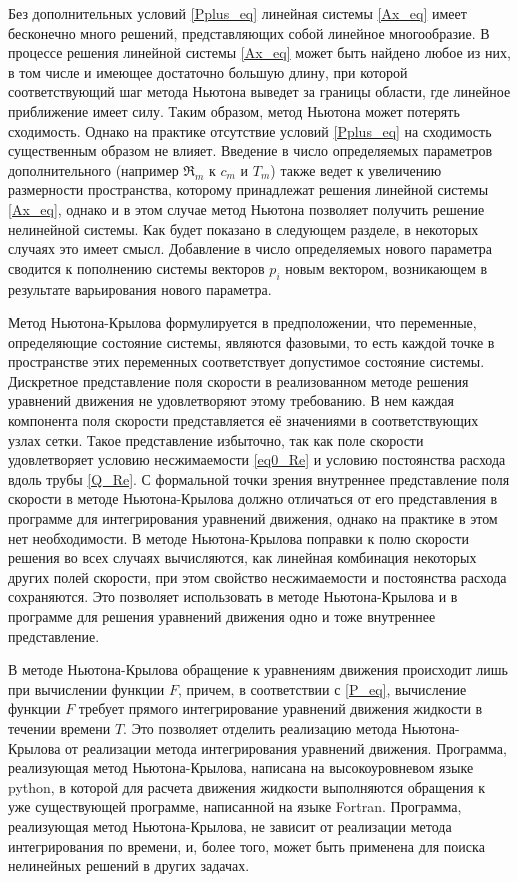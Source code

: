 Без дополнительных условий \eqref{Pplus_eq} линейная системы \eqref{Ax_eq} имеет бесконечно много решений, представляющих собой линейное многообразие. В процессе решения линейной системы \eqref{Ax_eq} может быть найдено любое из них, в том числе и имеющее достаточно большую длину, при которой соответствующий шаг метода Ньютона выведет за границы области, где линейное приближение имеет силу. Таким образом, метод Ньютона может потерять сходимость. Однако на практике отсутствие условий \eqref{Pplus_eq} на сходимость существенным образом не влияет. Введение в число определяемых параметров дополнительного (например $\Re_m$ к $c_m$ и $T_m$) также ведет к увеличению размерности пространства, которому принадлежат решения линейной системы \eqref{Ax_eq}, однако и в этом случае метод Ньютона позволяет получить решение нелинейной системы. Как будет показано в следующем разделе, в некоторых случаях это имеет смысл. Добавление в число определяемых нового параметра сводится к пополнению системы векторов $p_i$ новым вектором, возникающем в результате варьирования нового параметра. 

Метод Ньютона-Крылова формулируется в предположении, что переменные, определяющие состояние системы, являются фазовыми, то есть каждой точке в пространстве этих переменных соответствует допустимое состояние системы. Дискретное представление поля скорости в реализованном методе решения уравнений движения не удовлетворяют этому требованию. В нем каждая компонента поля скорости представляется её значениями в соответствующих узлах сетки. Такое представление избыточно, так как поле скорости удовлетворяет условию несжимаемости \eqref{eq0_Re} и условию постоянства расхода вдоль трубы \eqref{Q_Re}. С формальной точки зрения внутреннее представление поля скорости в методе Ньютона-Крылова должно отличаться от его представления в программе для интегрирования уравнений движения, однако на практике в этом нет необходимости. В методе Ньютона-Крылова поправки к полю скорости решения во всех случаях вычисляются, как линейная комбинация некоторых других полей скорости, при этом свойство несжимаемости и постоянства расхода сохраняются. Это позволяет использовать в методе Ньютона-Крылова и в программе для решения уравнений движения одно и тоже внутреннее представление. 

В методе Ньютона-Крылова обращение к уравнениям движения происходит лишь при вычислении функции $F$, причем, в соответствии с \eqref{P_eq}, вычисление функции $F$ требует прямого интегрирование уравнений движения жидкости в течении времени $T$. Это позволяет отделить реализацию метода Ньютона-Крылова от реализации метода интегрирования уравнений движения. Программа, реализующая метод Ньютона-Крылова, написана на высокоуровневом языке python, в которой для расчета движения жидкости выполняются обращения к уже существующей программе, написанной на языке Fortran. Программа, реализующая метод Ньютона-Крылова, не зависит от реализации метода интегрирования по времени, и, более того, может быть применена для поиска нелинейных решений в других задачах. 


